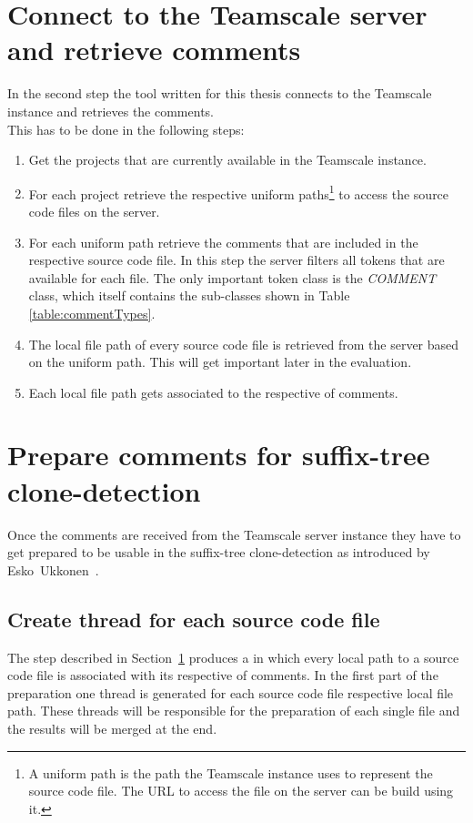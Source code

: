 \section{Connect to the Teamscale server and retrieve comments}
\label{section:retrieveComments}
In the second step the tool written for this thesis connects to the Teamscale instance and retrieves the comments.\\
This has to be done in the following steps:
\begin{enumerate}
	\item Get the projects that are currently available in the Teamscale instance. 
	\item For each project retrieve the respective uniform paths\footnote{A uniform path is the path the Teamscale instance uses to represent the source code file. The URL to access the file on the server can be build using it.} to access the source code files on the server.
	\item For each uniform path retrieve the comments that are included in the respective source code file. In this step the server filters all tokens that are available for each file. The only important token class is the \textit{COMMENT} class, which itself contains the sub-classes shown in Table \ref{table:commentTypes}.
	\item The local file path of every source code file is retrieved from the server based on the uniform path. This will get important later in the evaluation.
	\item Each local file path gets associated to the respective  of comments.
\end{enumerate}



\section{Prepare comments for suffix-tree clone-detection}
Once the comments are received from the Teamscale server instance they have to get prepared to be usable in the suffix-tree clone-detection as introduced by Esko~Ukkonen~\cite{Ukkonen1995}\cite{Ukkonen1993}.

\subsection{Create thread for each source code file}
The step described in Section~\ref{section:retrieveComments} produces a  in which every local path to a source code file is associated with its respective  of comments.
In the first part of the preparation one thread is generated for each source code file respective local file path. These threads will be responsible for the preparation of each single file and the results will be merged at the end.\\

